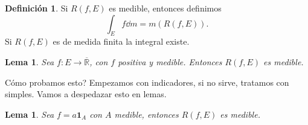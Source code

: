 \documentclass[12pt]{article}
\theoremstyle{plain}
\newtheorem{Lem}[Th]{Lema}             %
\theoremstyle{definition}
\newtheorem{Def}[Th]{Definición}       %
\theoremstyle{remark}
\numberwithin{equation}{section}
\newcommand{\bR}{\mathbb{R}}        %
\newcommand{\ind}{\mathbf{1}}       %
\renewcommand{\:}{\colon}           %
\begin{document}
\begin{multicols}{2}
\begin{Def}
  Si $R(f,E)$ es medible, entonces definimos
  $$\int_{E}f\dd m=m(R(f,E)).$$
  Si $R(f,E)$ es de medida finita la integral existe.
\end{Def}

\begin{Lem}\label{lem:posYMedImplicaAreaMedible}
  Sea $f\: E\to\overline{\bR}$, con $f$ positiva y medible. Entonces $R(f,E)$ es medible.
\end{Lem}

Cómo probamos esto? Empezamos con indicadores, si no sirve, tratamos con simples. Vamos a despedazar esto en lemas.

\begin{Lem}
  Sea $f=a\ind_A$ con $A$ medible, entonces $R(f,E)$ es medible.
\end{Lem}


\end{multicols}
\end{document}
